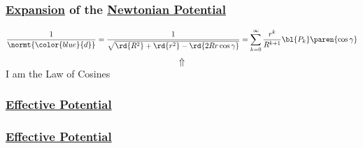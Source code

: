 \begin{frame}\frametitle{\href{https://en.wikipedia.org/wiki/Legendre\_polynomials\#Expanding\_a\_1/r\_potential}{Expansion} of the \href{https://en.wikipedia.org/wiki/Newtonian\_potential}{Newtonian Potential}}
\begin{equation}
	\frac{1}{\normt{\color{blue}{d}}} = \frac{1}{\sqrt{\rd{R^{2}}+ \rd{r^{2}} -\rd{2Rr \cos \gamma}}} = \sum_{k=0}^{\infty}\frac{r^{k}}{R^{k+1}} \bl{P_{k}}\paren{\cos \gamma}
\end{equation}
$$\Uparrow$$
\center
I am the Law of Cosines
\end{frame}

\begin{frame}\frametitle{\href{https://en.wikipedia.org/wiki/Effective_potential}{Effective Potential}}
\center

\end{frame}

\begin{frame}\frametitle{\href{https://en.wikipedia.org/wiki/Effective_potential}{Effective Potential}}
\center

\end{frame}


